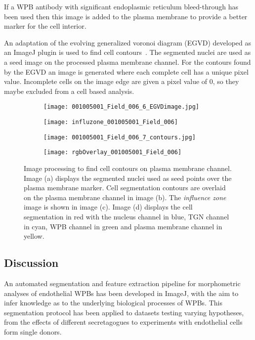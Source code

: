 If a WPB antibody with significant endoplasmic reticulum bleed-through has been used then this image is added to the plasma membrane to provide a better marker for the cell interior.

An adaptation of the evolving generalized voronoi diagram (EGVD) developed as an ImageJ plugin is used to find cell contours~\cite{Yu2010}. The segmented nuclei are used as a seed image on the processed plasma membrane channel. For the contours found by the EGVD an image is generated where each complete cell has a unique pixel value. Incomplete cells on the image edge are given a pixel value of 0, so they maybe excluded from a cell based analysis.

\begin{figure}[htbp] 
	\begin{subfigure}[b]{0.49\linewidth}
		\centering
		\texttt{[image: 001005001\_Field\_006\_6\_EGVDimage.jpg]} 
		\caption{} 
		\label{pmChannel:a} 
		\vspace{1ex}
	\end{subfigure} 
	\begin{subfigure}[b]{0.49\linewidth}
		\centering
		\texttt{[image: influzone\_001005001\_Field\_006]} 
		\caption{} 
		\label{pmChannel:b} 
		\vspace{1ex}
	\end{subfigure}
	\begin{subfigure}[b]{0.49\linewidth}
		\centering
		\texttt{[image: 001005001\_Field\_006\_7\_contours.jpg]} 
		\caption{} 
		\label{pmChannel:c} 
	\end{subfigure} 
	\begin{subfigure}[b]{0.49\linewidth}
		\centering
		\texttt{[image: rgbOverlay\_001005001\_Field\_006]}
		\caption{} 
		\label{pmChannel:d} 
	\end{subfigure}
\caption{Image processing to find cell contours on plasma membrane channel. Image (a) displays the segmented nuclei used as seed points over the plasma membrane marker. Cell segmentation contours are overlaid on the plasma membrane channel in image (b). The \emph{influence zone} image is shown in image (c). Image (d) displays the cell segmentation in red with the nucleus channel in blue, TGN channel in cyan, WPB channel in green and plasma membrane channel in yellow.}
\label{pmChannel} 
\end{figure}

\subsection{Discussion}
An automated segmentation and feature extraction pipeline for morphometric analyses of endothelial WPBs has been developed in ImageJ, with the aim to infer knowledge as to the underlying biological processes of WPBs. This segmentation protocol has been applied to datasets testing varying hypotheses, from the effects of different secretagogues to experiments with endothelial cells form single donors.

